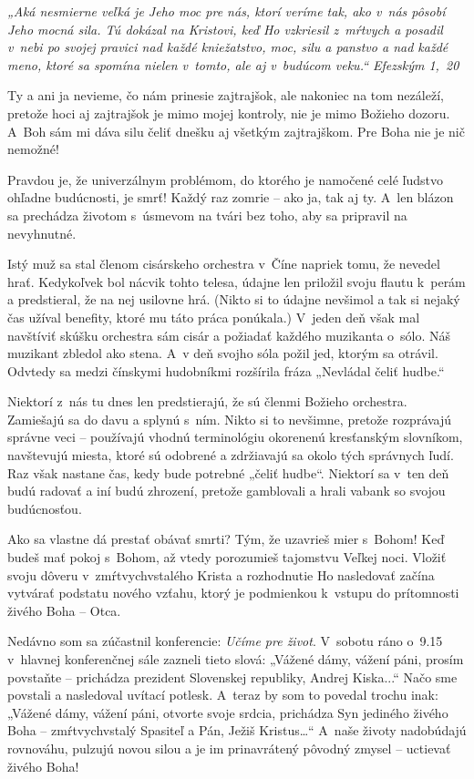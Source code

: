 {\it „Aká nesmierne veľká je Jeho moc pre nás, ktorí veríme tak, ako v~nás pôsobí Jeho mocná sila. Tú dokázal na Kristovi, keď Ho vzkriesil z~mŕtvych a posadil v~nebi po svojej pravici nad každé kniežatstvo, moc, silu a panstvo a nad každé meno, ktoré sa spomína nielen v~tomto, ale aj v~budúcom veku.“ Efezským 1,~20}

Ty a ani ja nevieme, čo nám prinesie zajtrajšok, ale nakoniec na tom nezáleží, pretože hoci aj zajtrajšok je mimo mojej kontroly, nie je mimo Božieho dozoru. A~Boh sám mi dáva silu čeliť dnešku aj všetkým zajtrajškom. Pre Boha nie je nič nemožné!


Pravdou je, že univerzálnym problémom, do ktorého je namočené celé ľudstvo ohľadne budúcnosti, je smrť! Každý raz zomrie -- ako ja, tak aj ty. A~len blázon sa prechádza životom s~úsmevom na tvári bez toho, aby sa pripravil na nevyhnutné.

Istý muž sa stal členom cisárskeho orchestra v~Číne napriek tomu, že nevedel hrať. Kedykoľvek bol nácvik tohto telesa, údajne len priložil svoju flautu k~perám a predstieral, že na nej usilovne hrá. (Nikto si to údajne nevšimol a tak si nejaký čas užíval benefity, ktoré mu táto práca ponúkala.) V~jeden deň však mal navštíviť skúšku orchestra sám cisár a požiadať každého muzikanta o~sólo. Náš muzikant zbledol ako stena. A~v deň svojho sóla požil jed, ktorým sa otrávil. Odvtedy sa medzi čínskymi hudobníkmi rozšírila fráza „Nevládal čeliť hudbe.“

Niektorí z~nás tu dnes len predstierajú, že sú členmi Božieho orchestra. Zamiešajú sa do davu a splynú s~ním. Nikto si to nevšimne, pretože rozprávajú správne veci -- používajú vhodnú terminológiu okorenenú kresťanským slovníkom, navštevujú miesta, ktoré sú odobrené a zdržiavajú sa okolo tých správnych ľudí. Raz však nastane čas, kedy bude potrebné „čeliť hudbe“. Niektorí sa v~ten deň budú radovať a iní budú zhrození, pretože gamblovali a hrali vabank so svojou budúcnosťou.

Ako sa vlastne dá prestať obávať smrti? Tým, že uzavrieš mier s~Bohom! Keď budeš mať pokoj s~Bohom, až vtedy porozumieš tajomstvu Veľkej noci. Vložiť svoju dôveru v~zmŕtvychvstalého Krista a rozhodnutie Ho nasledovať začína vytvárať podstatu nového vzťahu, ktorý je podmienkou k~vstupu do prítomnosti živého Boha -- Otca.

Nedávno som sa zúčastnil konferencie: {\it Učíme pre život}. V~sobotu ráno o~9.15 v~hlavnej konferenčnej sále zazneli tieto slová: „Vážené dámy, vážení páni, prosím povstaňte -- prichádza prezident Slovenskej republiky, Andrej Kiska...“ Načo sme povstali a nasledoval uvítací potlesk. A~teraz by som to povedal trochu inak: „Vážené dámy, vážení páni, otvorte svoje srdcia, prichádza Syn jediného živého Boha -- zmŕtvychvstalý Spasiteľ a Pán, Ježiš Kristus…“ A~naše životy nadobúdajú rovnováhu, pulzujú novou silou a je im prinavrátený pôvodný zmysel -- uctievať živého Boha!

